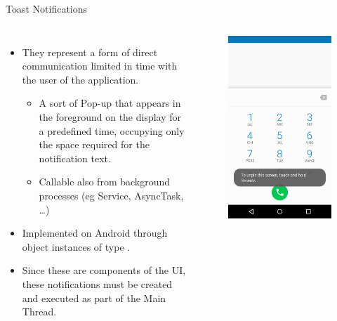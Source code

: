 \documentclass{beamer}
\begin{document}
  \begin{frame}{Toast Notifications}
    \begin{columns}[t]
      \begin{itemize}\itemsep10pt
        \item They represent a form of direct communication limited in time with
        the user of the application.
        \begin{itemize}
          \item A sort of Pop-up that appears in the foreground on the display
          for a predefined time, occupying only the space required for the
          notification text.
          \item Callable also from background processes (eg Service, AsyncTask, \dots)
        \end{itemize}
        \item Implemented on Android through object instances of type
        .
        \item Since these are components of the UI, these notifications must be
        created and executed as part of the Main Thread.
      \end{itemize}
      \begin{figure}
        \includegraphics[width=0.8\linewidth]{figures/toast_example.png}

\end{figure}
\end{columns}
\end{frame}
\end{document}
